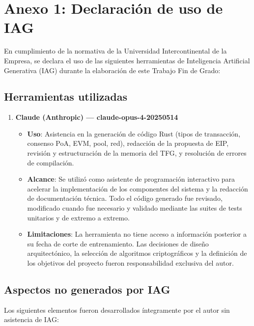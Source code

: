 \section{Anexo 1: Declaración de uso de IAG}
\label{sec:anexo_iag}

En cumplimiento de la normativa de la Universidad Intercontinental de la Empresa, se declara el uso de las siguientes herramientas de Inteligencia Artificial Generativa (IAG) durante la elaboración de este Trabajo Fin de Grado:

\subsection*{Herramientas utilizadas}

\begin{enumerate}
  \item \textbf{Claude (Anthropic) --- claude-opus-4-20250514}
  \begin{itemize}
    \item \textbf{Uso}: Asistencia en la generación de código Rust (tipos de transacción, consenso PoA, EVM, pool, red), redacción de la propuesta de EIP, revisión y estructuración de la memoria del TFG, y resolución de errores de compilación.
    \item \textbf{Alcance}: Se utilizó como asistente de programación interactivo para acelerar la implementación de los componentes del sistema y la redacción de documentación técnica. Todo el código generado fue revisado, modificado cuando fue necesario y validado mediante las suites de tests unitarios y de extremo a extremo.
    \item \textbf{Limitaciones}: La herramienta no tiene acceso a información posterior a su fecha de corte de entrenamiento. Las decisiones de diseño arquitectónico, la selección de algoritmos criptográficos y la definición de los objetivos del proyecto fueron responsabilidad exclusiva del autor.
  \end{itemize}
\end{enumerate}

\subsection*{Aspectos no generados por IAG}

Los siguientes elementos fueron desarrollados íntegramente por el autor sin asistencia de IAG:

